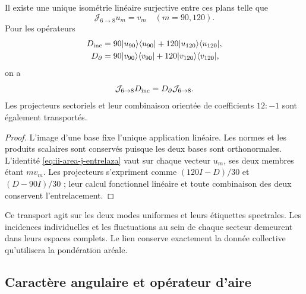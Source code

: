 \begin{theorem}
\label{thm:ii-area-entrelazamiento-colectivo}
Il existe une unique isométrie linéaire surjective entre ces plans telle que
\begin{equation}
 \mathcal J_{6\to8}u_m=v_m\quad(m=90,120).
 \label{eq:ii-area-j-colectivo}
\end{equation}
Pour les opérateurs
\[
 \begin{aligned}
 D_{\rm inc}&=90|u_{90}\rangle\langle u_{90}|
             +120|u_{120}\rangle\langle u_{120}|,\\
 D_\partial&=90|v_{90}\rangle\langle v_{90}|
             +120|v_{120}\rangle\langle v_{120}|,
 \end{aligned}
\]
on a
\begin{equation}
 \mathcal J_{6\to8}D_{\rm inc}
 =D_\partial\mathcal J_{6\to8}.
 \label{eq:ii-area-j-entrelaza}
\end{equation}
Les projecteurs sectoriels et leur combinaison orientée de coefficients
\(12:-1\) sont également transportés.
\end{theorem}
\begin{proof}
L'image d'une base fixe l'unique application linéaire. Les normes et les
produits scalaires sont conservés puisque les deux bases sont orthonormales.
L'identité \eqref{eq:ii-area-j-entrelaza} vaut sur chaque vecteur
\(u_m\), ses deux membres étant \(m v_m\). Les projecteurs
s'expriment comme \((120I-D)/30\) et \((D-90I)/30\) ; leur calcul fonctionnel
linéaire et toute combinaison des deux conservent l'entrelacement.
\end{proof}

Ce transport agit sur les deux modes uniformes et leurs étiquettes
spectrales. Les incidences individuelles et les fluctuations au sein de
chaque secteur demeurent dans leurs espaces complets. Le lien conserve
exactement la donnée collective qu'utilisera la pondération aréale.

\subsection{Caractère angulaire et opérateur d'aire}
\label{sec:ii-area-caracter}


